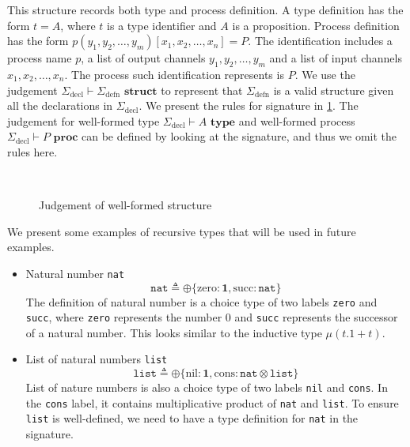 \documentclass[12pt, openany]{memoir}
\begin{document}
This structure records both type and process definition. A type definition has the form $t = A$, where 
$t$ is a type identifier and $A$ is a proposition. Process definition has the form $p (y_1, y_2, \ldots, y_m) [x_1, x_2, \ldots, x_n] = P$.
The identification includes a process name $p$, a list of output channels $y_1, y_2, \ldots, y_m$ and a list of input channels $x_1, x_2, \ldots, x_n$.
The process such identification represents is $P$. We use the judgement $\Sigma_{\text{decl}} \vdash \Sigma_{\text{defn}} \textbf{ struct}$ to represent that
$\Sigma_{\text{defn}}$ is a valid structure given all the declarations in $\Sigma_{\text{decl}}$. We present the rules for signature in \cref{fig:sig}. 
The judgement for well-formed type $\Sigma_{\text{decl}} \vdash A \textbf{ type}$ and well-formed process $\Sigma_{\text{decl}} \vdash P \textbf{ proc}$ can be defined by looking at the signature, and thus we omit the rules here.
\begin{figure}[H]
  \centering
  \begin{rules}
    \qquad
    \\
  \end{rules}
  \caption{Judgement of well-formed structure}
  \label{fig:sig}
\end{figure}
We present some examples of recursive types that will be used in future examples.
\begin{itemize}
  \item Natural number \texttt{nat}
  \[
    \texttt{nat} \triangleq \oplus\{\text{zero} : \textbf{1}, \text{succ} : \texttt{nat}\}
  \]
  The definition of natural number is a choice type of two labels \texttt{zero} and \texttt{succ},
  where \texttt{zero} represents the number $0$ and \texttt{succ} represents the successor of a natural number.
  This looks similar to the inductive type $\mu(t.1 + t)$.
  \item List of natural numbers \texttt{list}
  \[
    \texttt{list} \triangleq \oplus\{\text{nil} : \textbf{1}, \text{cons} : \texttt{nat} \otimes \texttt{list}\}
  \]
  List of nature numbers is also a choice type of two labels \texttt{nil} and \texttt{cons}.
  In the \texttt{cons} label, it contains multiplicative product of \texttt{nat} and \texttt{list}.
  To ensure \texttt{list} is well-defined, we need to have a type definition for \texttt{nat} in the signature. 
\end{itemize}
\end{document}
